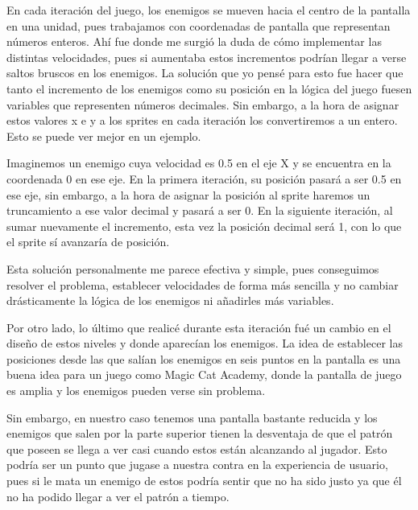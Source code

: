 En cada iteración del juego, los enemigos se mueven hacia el centro de la pantalla en una unidad, pues trabajamos con coordenadas de pantalla que representan números enteros. Ahí fue donde me surgió la duda de cómo implementar las distintas velocidades, pues si aumentaba estos incrementos podrían llegar a verse saltos bruscos en los enemigos. La solución que yo pensé para esto fue hacer que tanto el incremento de los enemigos como su posición en la lógica del juego fuesen variables que representen números decimales. Sin embargo, a la hora de asignar estos valores x e y a los sprites en cada iteración los convertiremos a un entero. Esto se puede ver mejor en un ejemplo.

\vspace{0.5cm}

Imaginemos un enemigo cuya velocidad es 0.5 en el eje X y se encuentra en la coordenada 0 en ese eje. En la primera iteración, su posición pasará a ser 0.5 en ese eje, sin embargo, a la hora de asignar la posición al sprite haremos un truncamiento a ese valor decimal y pasará a ser 0. En la siguiente iteración, al sumar nuevamente el incremento, esta vez la posición decimal será 1, con lo que el sprite sí avanzaría de posición.

\vspace{0.5cm}

Esta solución personalmente me parece efectiva y simple, pues conseguimos resolver el problema, establecer velocidades de forma más sencilla y no cambiar drásticamente la lógica de los enemigos ni añadirles más variables.

\vspace{0.5cm}

Por otro lado, lo último que realicé durante esta iteración fué un cambio en el diseño de estos niveles y donde aparecían los enemigos. La idea de establecer las posiciones desde las que salían los enemigos en seis puntos en la pantalla es una buena idea para un juego como Magic Cat Academy, donde la pantalla de juego es amplia y los enemigos pueden verse sin problema.

\vspace{0.5cm}

Sin embargo, en nuestro caso tenemos una pantalla bastante reducida y los enemigos que salen por la parte superior tienen la desventaja de que el patrón que poseen se llega a ver casi cuando estos están alcanzando al jugador. Esto podría ser un punto que jugase a nuestra contra en la experiencia de usuario, pues si le mata un enemigo de estos podría sentir que no ha sido justo ya que él no ha podido llegar a ver el patrón a tiempo.

